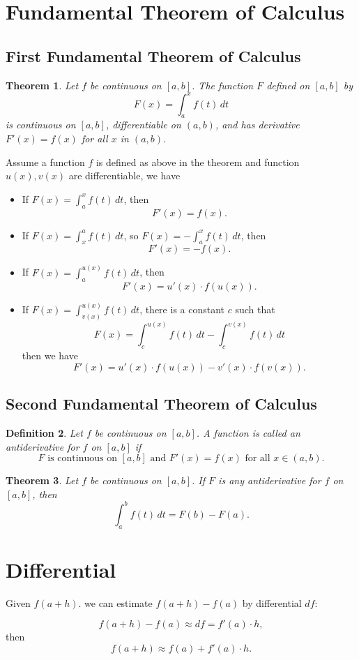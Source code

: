 \documentclass[12pt]{article}
\newtheorem{theorem}{\bf Theorem}[section]
\newtheorem{definition}[theorem]{Definition}
\begin{document}
\clearpage

\section{ Fundamental Theorem of Calculus}

\subsection{ First Fundamental Theorem of Calculus}
\begin{theorem}
Let $f$ be continuous on $[a,b]$. The function $F$ defined on $[a,b]$ by 
$$F(x)=\int_{a}^{x} f(t)\, dt$$
is continuous on $[a,b]$, differentiable on $(a,b)$, and has derivative
$F'(x)=f(x)$ for all $x$ in $(a,b)$.
\end{theorem}

Assume a function $f$ is defined as above in the theorem and function $u(x), v(x)$ are differentiable, we have
\begin{itemize}
\item[(1)] If $F(x)=\int_{a}^{x} f(t)\, dt$, then $$F'(x)=f(x).$$

\item[(2)] If $F(x)=\int_{x}^{a} f(t)\, dt$, so $F(x)=-\int_{a}^{x} f(t)\, dt$, then
$$F'(x)=-f(x).$$

\item[(3)] If $F(x)=\int_{a}^{u(x)} f(t)\, dt$, then 
$$F'(x)=u'(x)\cdot f(u(x)).$$

\item[(3)] If $F(x)=\int_{v(x)}^{u(x)} f(t)\, dt$, there is a constant $c$ such that
$$F(x)=\int_{c}^{u(x)} f(t)\, dt- \int_{c}^{v(x)} f(t)\, dt$$
then we have 
$$F'(x)=u'(x)\cdot f(u(x))- v'(x)\cdot f(v(x)).$$
\end{itemize}

\subsection{ Second Fundamental Theorem of Calculus}
\begin{definition}
Let $f$ be continuous on $[a,b]$. A function is called an antiderivative for $f$ on $[a,b]$ if 
$$F \text{ is continuous on } [a,b] \text{ and } F'(x)=f(x) \text{ for all } x \in (a,b).$$
\end{definition}

\begin{theorem}
Let $f$ be continuous on $[a,b]$. If $F$ is any antiderivative for $f$ on $[a,b]$, then
$$\int_{a}^{b} f(t)\, dt = F(b)-F(a).$$
\end{theorem}

\section{Differential}
Given $f(a+h)$. we can estimate $f(a+h) -f(a)$ by differential $df$:

$$f(a+h)-f(a) \approx df= f'(a)\cdot h,$$ then
$$f(a+h) \approx f(a)+ f'(a)\cdot h.$$
\end{document}
